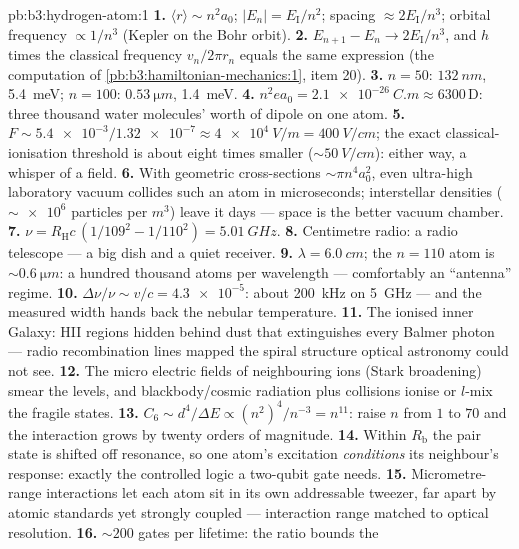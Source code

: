\begin{solution}{pb:b3:hydrogen-atom:1}
\textbf{1.} $\langle r\rangle \sim n^2a_0$; $|E_n| =
E_{\text{I}}/n^2$; spacing $\approx 2E_{\text{I}}/n^3$; orbital
frequency $\propto 1/n^3$ (Kepler on the Bohr orbit).
\textbf{2.} $E_{n+1} - E_n \to 2E_{\text{I}}/n^3$, and $h$ times
the classical frequency $v_n/2\pi r_n$ equals the same expression
(the computation of \cref{pb:b3:hamiltonian-mechanics:1}, item 20).
\textbf{3.} $n = 50$: $\qty{132}{nm}$, \qty{5.4}{meV}; $n = 100$:
$\qty{0.53}{\micro m}$, \qty{1.4}{meV}.
\textbf{4.} $n^2ea_0 = \qty{2.1e-26}{C.m} \approx 6300\,\text{D}$:
three thousand water molecules' worth of dipole on one atom.
\textbf{5.} $F \sim \num{5.4e-3}/\num{1.32e-7} \approx
\qty{4e4}{V/m} = \qty{400}{V/cm}$; the exact classical-ionisation
threshold is about eight times smaller ($\sim\qty{50}{V/cm}$):
either way, a whisper of a field.
\textbf{6.} With geometric cross-sections $\sim\pi n^4a_0^2$, even
ultra-high laboratory vacuum collides such an atom in
microseconds; interstellar densities ($\sim\num{e6}$ particles per
$\unit{m^3}$) leave it days --- space is the better vacuum chamber.
\textbf{7.} $\nu = R_{\text{H}}c\,(1/109^2 - 1/110^2) =
\qty{5.01}{GHz}$.
\textbf{8.} Centimetre radio: a radio telescope --- a big dish and
a quiet receiver.
\textbf{9.} $\lambda = \qty{6.0}{cm}$; the $n = 110$ atom is
$\sim\qty{0.6}{\micro m}$: a hundred thousand atoms per
wavelength --- comfortably an ``antenna'' regime.
\textbf{10.} $\Delta\nu/\nu \sim v/c = \num{4.3e-5}$: about
\qty{200}{kHz} on \qty{5}{GHz} --- and the measured width hands
back the nebular temperature.
\textbf{11.} The ionised inner Galaxy: HII regions hidden behind
dust that extinguishes every Balmer photon --- radio recombination
lines mapped the spiral structure optical astronomy could not see.
\textbf{12.} The micro electric fields of neighbouring ions (Stark
broadening) smear the levels, and blackbody/cosmic radiation plus
collisions ionise or $l$-mix the fragile states.
\textbf{13.} $C_6 \sim d^4/\Delta E \propto (n^2)^4/n^{-3} =
n^{11}$: raise $n$ from $1$ to $70$ and the interaction grows by
twenty orders of magnitude.
\textbf{14.} Within $R_{\text{b}}$ the pair state is shifted off
resonance, so one atom's excitation \emph{conditions} its
neighbour's response: exactly the controlled logic a two-qubit
gate needs.
\textbf{15.} Micrometre-range interactions let each atom sit in
its own addressable tweezer, far apart by atomic standards yet
strongly coupled --- interaction range matched to optical
resolution.
\textbf{16.} $\sim 200$ gates per lifetime: the ratio bounds the

\end{solution}
